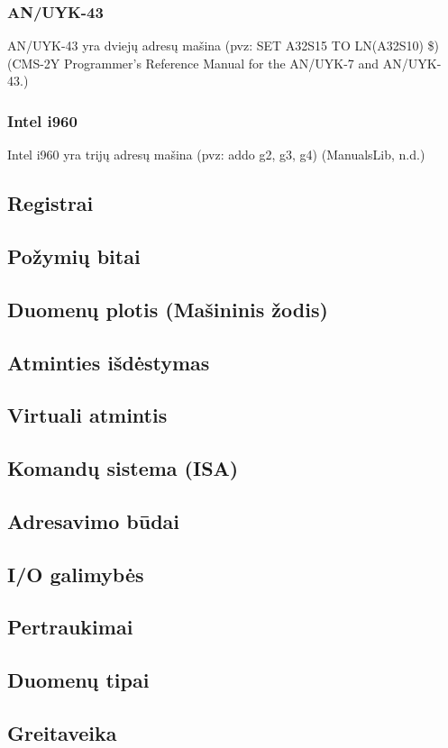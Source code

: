 \documentclass{article}
\begin{document}
\subsubsection{AN/UYK-43}
AN/UYK-43 yra dviejų adresų mašina (pvz: SET A32S15 TO LN(A32S10) \$) (CMS-2Y Programmer's Reference Manual for the AN/UYK-7 and AN/UYK-43.)
\subsubsection{Intel i960}
Intel i960 yra trijų adresų mašina (pvz: addo g2, g3, g4) (ManualsLib, n.d.)
\subsection{Registrai}
\subsection{Požymių bitai}
\subsection{Duomenų plotis (Mašininis žodis)}
\subsection{Atminties išdėstymas}
\subsection{Virtuali atmintis}
\subsection{Komandų sistema (ISA)}
\subsection{Adresavimo būdai}
\subsection{I/O galimybės}
\subsection{Pertraukimai}
\subsection{Duomenų tipai}
\subsection{Greitaveika}
\end{document}
